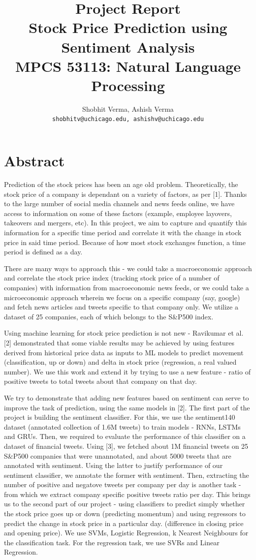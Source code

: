\documentclass{article}
\title{Project Report\\Stock Price Prediction using Sentiment Analysis\\ MPCS 53113: Natural Language Processing}
\author{Shobhit Verma, Ashish Verma \\ \texttt{shobhitv@uchicago.edu, ashishv@uchicago.edu}}
\begin{document}
\maketitle

\section{Abstract}
Prediction of the stock prices has been an age old problem. Theoretically, the stock price of a company is dependant on a variety of factors, as per [1]. Thanks to the large number of social media channels and news feeds online, we have access to information on some of these factors (example, employee layovers, takeovers and mergers, etc). In this project, we aim to capture and quantify this information for a specific time period and correlate it with the change in stock price in said time period. Because of how most stock exchanges function, a time period is defined as a day. 

There are many ways to approach this - we could take a macroeconomic approach and correlate the stock price index (tracking stock price of a number of companies) with information from macroeconomic news feeds, or we could take a microeconomic approach wherein we focus on a specific company (say, google) and fetch news articles and tweets specific to that company only. We utilize a dataset of 25 companies, each of which belongs to the S\&P500 index. 

Using machine learning for stock price prediction is not new - Ravikumar et al. [2] demonstrated that some viable results may be achieved by using features derived from historical price data as inputs to ML models to predict movement (classification, up or down) and delta in stock price (regression, a real valued number). We use this work and extend it by trying to use a new feature - ratio of positive tweets to total tweets about that company on that day.

We try to demonstrate that adding new features based on sentiment can serve to improve the task of prediction, using the same models in [2]. The first part of the project is building the sentiment classifier. For this, we use the sentiment140 dataset (annotated collection of 1.6M tweets) to train models - RNNs, LSTMs and GRUs. Then, we required to evaluate the performance of this classifier on a dataset of financial tweets. Using [3], we fetched about 1M financial tweets on 25 S\&P500 companies that were unannotated, and about 5000 tweets that are annotated with sentiment. Using the latter to justify performance of our sentiment classifier, we annotate the former with sentiment. Then, extracting the number of positive and negatove tweets per company per day is another task - from which we extract company specific positive tweets ratio per day.
This brings us to the second part of our project - using classifiers to predict simply whether the stock price goes up or down (predicting momentum) and using regressors to predict the change in stock price in a particular day. (difference in closing price and opening price). We use SVMs, Logistic Regression, k Nearest Neighbours for the classification task. For the regression task, we use SVRs and Linear Regression.
\end{document}
